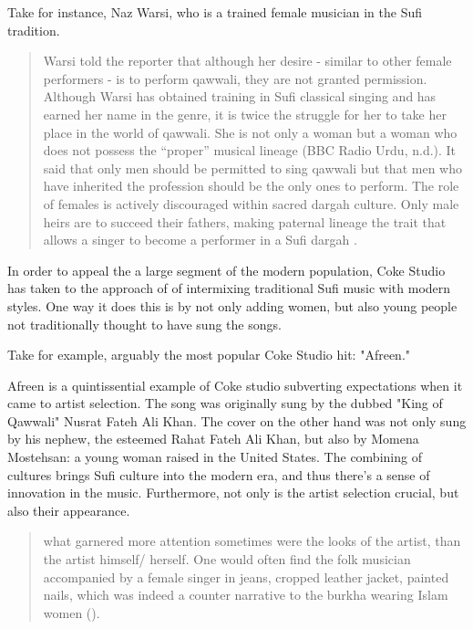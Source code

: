 \documentclass{article}
\begin{document}
  Take for instance, Naz Warsi, who is a trained female musician in the Sufi tradition. 

  \begin{quote}

    Warsi told the reporter that although her desire - similar to other female
    performers - is to perform qawwali, they are not granted permission.
    Although Warsi has obtained training in Sufi classical singing and has
    earned her name in the genre, it is twice the struggle for her to take her
    place in the world of qawwali. She is not only a woman but a woman who does
    not possess the “proper” musical lineage (BBC Radio Urdu, n.d.).  It said
    that only men should be permitted to sing qawwali but that men who have
    inherited the profession should be the only ones to perform. The role of
    females is actively discouraged within sacred dargah culture. Only male
    heirs are to succeed their fathers, making paternal lineage the trait that
    allows a singer to become a performer in a Sufi dargah
    \autocite{beg2020fizzy}.

  \end{quote}

  In order to appeal the a large segment of the modern population, Coke Studio
  has taken to the approach of of intermixing traditional Sufi music with modern
  styles. One way it does this is by not only adding women, but also young
  people not traditionally thought to have sung the songs. 

  Take for example, arguably the most popular Coke Studio hit: "Afreen."

  Afreen is a quintissential example of Coke studio subverting expectations when
  it came to artist selection. The song was originally sung by the dubbed "King
  of Qawwali" Nusrat Fateh Ali Khan. The cover on the other hand was not only
  sung by his nephew, the esteemed Rahat Fateh Ali Khan, but also by Momena
  Mostehsan: a young woman raised in the United States. The combining of
  cultures brings Sufi culture into the modern era, and thus there's a sense of
  innovation in the music. Furthermore, not only is the artist selection crucial,
  but also their appearance. 

\begin{quote}
  what garnered more attention sometimes were the looks of the artist, than the
  artist himself/ herself. One would often find the folk musician accompanied by a
  female singer in jeans, cropped leather jacket, painted nails, which was indeed
  a counter narrative to the burkha wearing Islam women (\autocite{Chibmedium}).
\end{quote}
\end{document}
